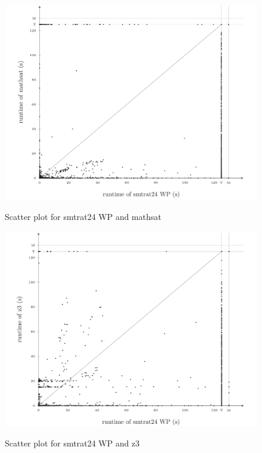 \begin{figure}[]
    \centering
    \caption{Scatter plot for smtrat24 WP and mathsat}
    \includegraphics[width=1\linewidth]{./figures/scatter-smtrat_24_preprocessing-mathsat.pdf}
  \label{fig:Scatter_plot_for_smtrat24_WP_and_mathsat}
\end{figure}

\begin{figure}[]
    \centering
    \caption{Scatter plot for smtrat24 WP and z3}
    \includegraphics[width=1\linewidth]{./figures/scatter-smtrat_24_preprocessing-z3.pdf}
    \label{fig:Scatter_plot_for_smtrat24_WP_and_z3}
\end{figure}


